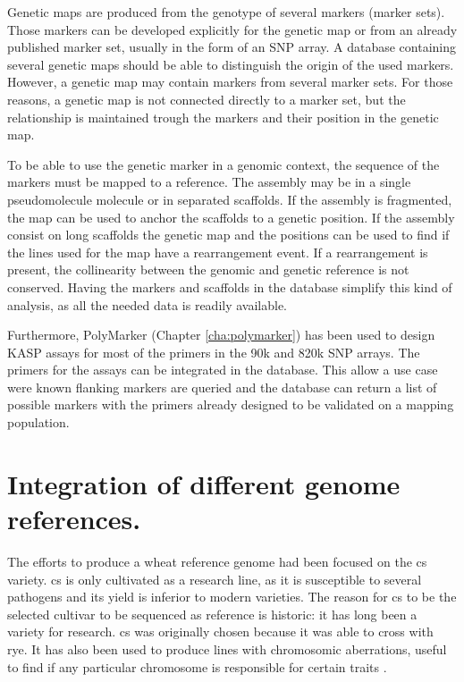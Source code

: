 Genetic maps are produced from the genotype of several markers (marker sets). 
Those markers can be developed explicitly for the genetic map or from an already published marker set, usually in the form of an SNP array. 
A database containing several genetic maps should be able to distinguish the origin of the used markers.
However, a genetic map may contain markers from several marker sets.
For those reasons, a genetic map is not connected directly to a marker set, but the relationship is maintained trough the markers and their position in the genetic map.

To be able to use the genetic marker in a genomic context, the sequence of the markers must be mapped to a reference. 
The assembly may be in a single pseudomolecule molecule or in separated scaffolds. 
If the assembly is fragmented, the  map can be used to anchor the scaffolds to a genetic position. 
If the assembly consist on long scaffolds the genetic map and the positions can be used to find if the lines used for the map have a rearrangement event. 
If a rearrangement is present, the collinearity between the genomic and genetic reference is not conserved. 
Having the markers and scaffolds in the database simplify this kind of analysis, as all the needed data is readily available. 

Furthermore, PolyMarker (Chapter \ref{cha:polymarker}) has been used to design KASP assays for most of the primers in the 90k \citep{Wang2014} and 820k \citet{Winfield2016} SNP arrays. 
The primers for the assays can be integrated in the database. 
This allow a use case were known flanking markers are queried and the database can return a list of possible markers with the primers already designed to be validated on a mapping population. 

\section{Integration of different genome references. }

The efforts to produce a wheat reference genome had been focused on the \gls{cs} variety. 
\acrshort{cs} is only cultivated as a research line, as it is susceptible to several pathogens and its yield is inferior to modern varieties.  
The reason for \acrshort{cs} to be the selected cultivar to be sequenced as reference is historic: it has long been a variety  for research.
\acrshort{cs} was originally chosen because it was able to cross with rye. 
It has also been used to produce lines with chromosomic aberrations, useful to find if any particular chromosome is responsible for certain traits \citep{Sears1985}. 

